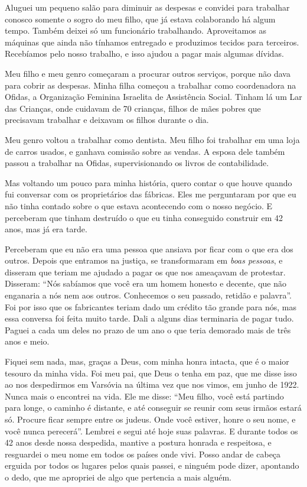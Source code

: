 Aluguei um
pequeno salão para diminuir as despesas e convidei para trabalhar
conosco somente o sogro do
meu filho, que já estava colaborando há algum tempo. Também deixei só um funcionário trabalhando. Aproveitamos as
máquinas que ainda não tínhamos entregado e produzimos tecidos para
terceiros. Recebíamos pelo nosso trabalho, e isso ajudou a pagar mais
algumas dívidas.

Meu filho e meu genro começaram a procurar outros serviços, porque não
dava para cobrir as despesas. Minha filha começou a
trabalhar como coordenadora na Ofidas, a Organização Feminina Israelita de Assistência Social. Tinham lá um Lar das Crianças, onde cuidavam de 70 crianças, filhos de mães
pobres que precisavam trabalhar e deixavam os filhos durante o dia.

Meu genro voltou a trabalhar como dentista. Meu filho foi
trabalhar em uma loja de carros usados, e ganhava comissão sobre as
vendas. A esposa dele também passou a trabalhar na Ofidas,
supervisionando os livros de contabilidade.

Mas voltando um pouco para minha história, quero contar o que houve quando fui
conversar com os proprietários das fábricas. Eles me perguntaram por que
eu não tinha contado sobre o que estava acontecendo com o
nosso negócio. E perceberam que tinham destruído o que eu tinha
conseguido construir em 42 anos, mas já era tarde.

Perceberam que eu não era uma pessoa que ansiava por ficar com o que era
dos outros. Depois que entramos na justiça, se transformaram em \textit{boas pessoas}, e disseram que teriam me ajudado a pagar os
que nos ameaçavam de protestar. Disseram: ``Nós sabíamos que você era um
homem honesto e decente, que não enganaria a nós nem aos outros.
Conhecemos o seu passado, retidão e palavra''. Foi por isso que os fabricantes teriam dado um crédito tão grande para nós, mas essa
conversa foi feita muito tarde. Dali a alguns dias terminaria de pagar
tudo. Paguei a cada um deles no prazo de um ano o que teria demorado
mais de três anos e meio.

Fiquei sem nada, mas, graças a Deus, com minha honra intacta, que é
o maior tesouro da minha vida. Foi meu pai, que Deus o tenha em
paz, que me disse isso ao nos despedirmos em Varsóvia na última
vez que nos vimos, em junho de 1922. Nunca mais o encontrei na vida. Ele me disse: 
``Meu filho, você está partindo para longe, o caminho é distante, e até
conseguir se reunir com seus irmãos estará só. Procure ficar sempre
entre os judeus. Onde você estiver, honre o seu nome, e você nunca
perecerá''. Lembrei e segui até hoje suas palavras. E durante todos os 42 anos desde nossa despedida, mantive a
postura honrada e respeitosa, e resguardei o meu nome em todos os países
onde vivi. Posso andar de cabeça erguida por todos os lugares pelos quais 
passei, e ninguém pode dizer, apontando o dedo, que me apropriei de
algo que pertencia a mais alguém.
